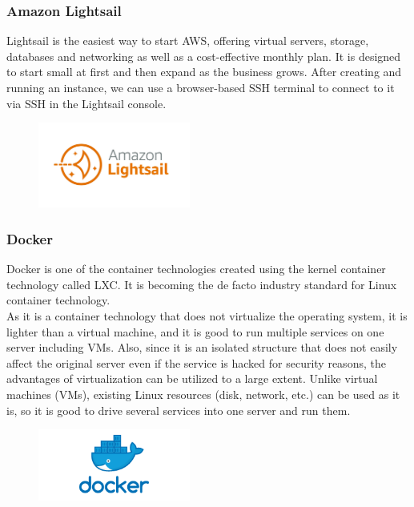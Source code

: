 \documentclass[conference]{IEEEtran}
\begin{document}
\subsubsection{Amazon Lightsail}
Lightsail is the easiest way to start AWS, offering virtual servers, storage, databases and networking as well as a cost-effective monthly plan. It is designed to start small at first and then expand as the business grows.
After creating and running an instance, we can use a browser-based SSH terminal to connect to it via SSH in the Lightsail console.\\
\begin{figure}[h!]
\centering
\includegraphics[width=5cm]{imagefolder/amazon.png}
\caption{}
\label{fig:map}
\end{figure}

\subsubsection{Docker}
Docker is one of the container technologies created using the kernel container technology called LXC. It is becoming the de facto industry standard for Linux container technology.\\
As it is a container technology that does not virtualize the operating system, it is lighter than a virtual machine, and it is good to run multiple services on one server including VMs. Also, since it is an isolated structure that does not easily affect the original server even if the service is hacked for security reasons, the advantages of virtualization can be utilized to a large extent. Unlike virtual machines (VMs), existing Linux resources (disk, network, etc.) can be used as it is, so it is good to drive several services into one server and run them.
\begin{figure}[h!]
\centering
\includegraphics[width=5cm]{imagefolder/docker.png}
\caption{}
\label{fig:map}
\end{figure}
\end{document}
